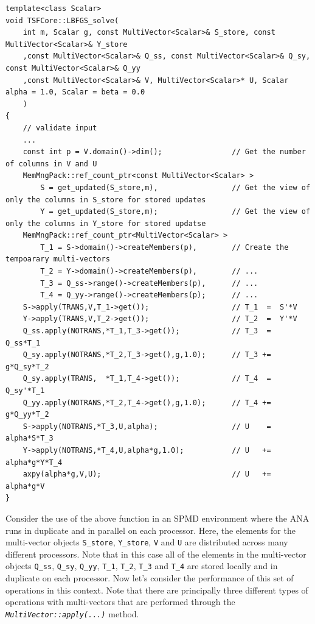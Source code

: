 \documentclass[10pt,fleqn]{article}
\begin{document}
{\scriptsize\begin{verbatim}
template<class Scalar>
void TSFCore::LBFGS_solve(
    int m, Scalar g, const MultiVector<Scalar>& S_store, const MultiVector<Scalar>& Y_store
    ,const MultiVector<Scalar>& Q_ss, const MultiVector<Scalar>& Q_sy, const MultiVector<Scalar>& Q_yy
    ,const MultiVector<Scalar>& V, MultiVector<Scalar>* U, Scalar alpha = 1.0, Scalar = beta = 0.0
    )
{
    // validate input
    ...
    const int p = V.domain()->dim();                // Get the number of columns in V and U
    MemMngPack::ref_count_ptr<const MultiVector<Scalar> >
        S = get_updated(S_store,m),                 // Get the view of only the columns in S_store for stored updates
        Y = get_updated(S_store,m);                 // Get the view of only the columns in Y_store for stored updatse
    MemMngPack::ref_count_ptr<MultiVector<Scalar> >
        T_1 = S->domain()->createMembers(p),        // Create the tempoarary multi-vectors
        T_2 = Y->domain()->createMembers(p),        // ...
        T_3 = Q_ss->range()->createMembers(p),      // ...
        T_4 = Q_yy->range()->createMembers(p);      // ...
    S->apply(TRANS,V,T_1->get());                   // T_1  =  S'*V
    Y->apply(TRANS,V,T_2->get());                   // T_2  =  Y'*V
    Q_ss.apply(NOTRANS,*T_1,T_3->get());            // T_3  =  Q_ss*T_1
    Q_sy.apply(NOTRANS,*T_2,T_3->get(),g,1.0);      // T_3 +=  g*Q_sy*T_2
    Q_sy.apply(TRANS,  *T_1,T_4->get());            // T_4  =  Q_sy'*T_1
    Q_yy.apply(NOTRANS,*T_2,T_4->get(),g,1.0);      // T_4 +=  g*Q_yy*T_2
    S->apply(NOTRANS,*T_3,U,alpha);                 // U    =  alpha*S*T_3
    Y->apply(NOTRANS,*T_4,U,alpha*g,1.0);           // U   +=  alpha*g*Y*T_4
    axpy(alpha*g,V,U);                              // U   +=  alpha*g*V
}
\end{verbatim}}

Consider the use of the above function in an SPMD environment where
the ANA runs in duplicate and in parallel on each processor.  Here,
the elements for the multi-vector objects \texttt{S\_store},
\texttt{Y\_store}, \texttt{V} and \texttt{U} are distributed across
many different processors.  Note that in this case all of the elements
in the multi-vector objects \texttt{Q\_ss}, \texttt{Q\_sy}, \texttt{Q\_yy},
\texttt{T\_1}, \texttt{T\_2}, \texttt{T\_3} and \texttt{T\_4} are stored
locally and in duplicate on each processor.  Now let's consider the
performance of this set of operations in this context.  Note that
there are principally three different types of operations with
multi-vectors that are performed through the
\texttt{\textit{MultiVector\-::apply(...)}} method.
\end{document}

